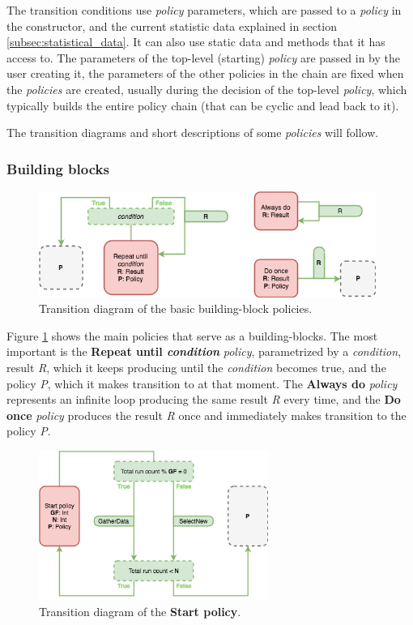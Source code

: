 The transition conditions use \textit{policy} parameters, which are passed to a \textit{policy} in the constructor, and the current statistic data explained in section \ref{subsec:statistical_data}. It can also use static data and methods that it has access to. The parameters of the top-level (starting) \textit{policy} are passed in by the user creating it, the parameters of the other policies in the chain are fixed when the \textit{policies} are created, usually during the decision of the top-level \textit{policy}, which typically builds the entire policy chain (that can be cyclic and lead back to it).

The transition diagrams and short descriptions of some \textit{policies} will follow.

\subsubsection{Building blocks}

\begin{figure}[h!]
	\captionsetup{justification=centering,margin=0.5cm}
	\centerline{\mbox{\includegraphics[width=110mm]{./img/helper_policies.png}}}
	\caption{Transition diagram of the basic building-block policies.}
	\label{fig:helper_policies}
\end{figure}

Figure \ref{fig:helper_policies} shows the main policies that serve as a building-blocks. The most important is the \textbf{Repeat until \textit{condition}} \textit{policy}, parametrized by a \textit{condition}, result \textit{R}, which it keeps producing until the \textit{condition} becomes true, and the policy \textit{P}, which it makes transition to at that moment. The \textbf{Always do} \textit{policy} represents an infinite loop producing the same result \textit{R} every time, and the \textbf{Do once} \textit{policy} produces the result \textit{R} once and immediately makes transition to the policy \textit{P}.

\begin{figure}[h!]
	\captionsetup{justification=centering,margin=0.5cm}
	\centerline{\mbox{\includegraphics[width=75mm]{./img/start_policy.png}}}
	\caption{Transition diagram of the \textbf{Start policy}.}
	\label{fig:start_policy}
\end{figure}

